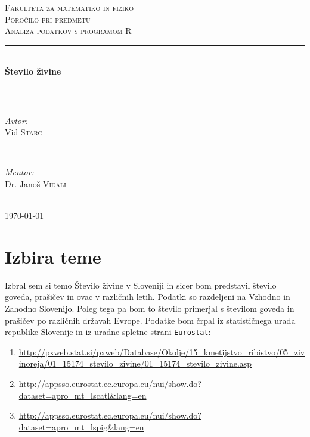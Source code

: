 \documentclass[11pt,a4paper]{article}
\begin{document}
\begin{titlepage}
\newcommand{\HRule}{\rule{\linewidth}{0.5mm}}
\center

\textsc{\LARGE Fakulteta za matematiko in fiziko}\\[3 cm]
\textsc{\Large Poročilo pri predmetu}\\[0.5cm]
\textsc{\large Analiza podatkov s programom R}\\[2 cm]
\HRule \\[0.4cm]
{ \huge \bfseries Število živine}\\[0.4cm] 
\HRule \\[6 cm]


\begin{minipage}{0.4\textwidth}
\begin{flushleft} \large
\emph{Avtor:}\\
Vid \textsc{Starc}
\end{flushleft}
\end{minipage}
~
\begin{minipage}{0.4\textwidth}
\begin{flushright} \large
\emph{Mentor:} \\
Dr. Janoš \textsc{Vidali}
\end{flushright}
\end{minipage}\\[2 cm]

{\large \today}\\[3cm] 


\end{titlepage}


\section{Izbira teme}
Izbral sem si temo Število živine v Sloveniji in sicer bom predstavil število goveda, prašičev in ovac v različnih letih. Podatki so razdeljeni na Vzhodno in Zahodno Slovenijo. Poleg tega pa bom to število primerjal s številom goveda in prašičev po različnih državah Evrope. Podatke bom črpal iz statističnega urada republike Slovenije in iz uradne spletne strani \verb|Eurostat|:
\begin{enumerate}
\item \url{http://pxweb.stat.si/pxweb/Database/Okolje/15_kmetijstvo_ribistvo/05_zivinoreja/01_15174_stevilo_zivine/01_15174_stevilo_zivine.asp}

\item \url{http://appsso.eurostat.ec.europa.eu/nui/show.do?dataset=apro_mt_lscatl&lang=en}

\item \url{http://appsso.eurostat.ec.europa.eu/nui/show.do?dataset=apro_mt_lspig&lang=en}
\end{enumerate}
\end{document}
